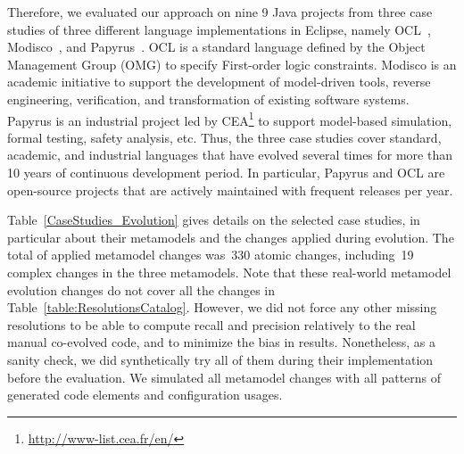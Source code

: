 	Therefore, we evaluated our approach on nine 9 Java projects from three case studies of three different language implementations in Eclipse, namely OCL~\cite{MDTOCL}, Modisco~\cite{MDTModisco}, and Papyrus~\cite{MDTPapyrus}. 
	OCL is a standard language defined by the Object Management Group (OMG) to specify First-order logic constraints. Modisco is an academic initiative to support the development of model-driven tools, reverse engineering, verification, and transformation of existing software systems. 
	Papyrus is an industrial project led by CEA\footnote{\url{http://www-list.cea.fr/en/}} to support model-based simulation, formal testing, safety analysis, etc.  
	Thus, the three case studies cover standard, academic, and industrial languages that %
	have evolved several times for more than 10 years of continuous development period. In particular, Papyrus and OCL are open-source projects that are actively maintained with frequent releases per year.
	
	
	Table~\ref{CaseStudies_Evolution} gives details on the selected case studies, in particular about their metamodels and the changes applied during evolution. The total of applied metamodel changes was~330 atomic changes, including~19 complex changes in the three metamodels. 
	Note that these real-world metamodel evolution changes do not cover all the changes in Table~\ref{table:ResolutionsCatalog}. However, we did not force any other missing resolutions to be able to compute recall and precision relatively to the real manual co-evolved code, and to minimize the bias in results. 
	Nonetheless, as a sanity check, we did synthetically try all of them during their implementation before the evaluation. We simulated all metamodel changes with all patterns of generated code elements and configuration usages. 
	
